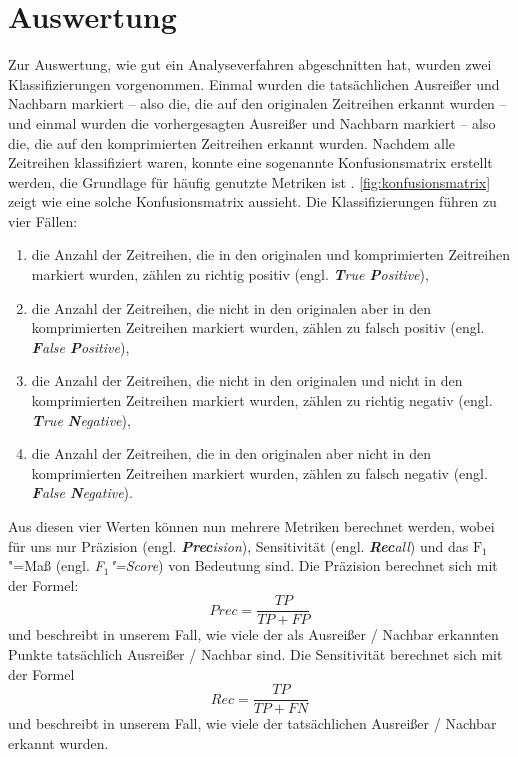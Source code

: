 \section{Auswertung}\label{sec:auswertung}
\newcommand{\tikztextc}[3]{\node at (#1, #2) {\vphantom{/}\smash{#3}};}
\newcommand{\tikztextupc}[3]{\node at (#1, #2) [rotate = 90] {\vphantom{/}\smash{#3}};}
Zur Auswertung, wie gut ein Analyseverfahren abgeschnitten hat, wurden zwei Klassifizierungen vorgenommen. Einmal wurden die tatsächlichen Ausreißer und Nachbarn markiert -- also die, die auf den originalen Zeitreihen erkannt wurden -- und einmal wurden die vorhergesagten Ausreißer und Nachbarn markiert -- also die, die auf den komprimierten Zeitreihen erkannt wurden. Nachdem alle Zeitreihen klassifiziert waren, konnte eine sogenannte Konfusionsmatrix erstellt werden, die Grundlage für häufig genutzte Metriken ist \cite{konfusionsmatrix}. \autoref{fig:konfusionsmatrix} zeigt wie eine solche Konfusionsmatrix aussieht. Die Klassifizierungen führen zu vier Fällen: \begin{enumerate}
    \item die Anzahl der Zeitreihen, die in den originalen und komprimierten Zeitreihen markiert wurden, zählen zu richtig positiv (engl. \textit{\textbf{T}rue \textbf{P}ositive}),
    \item die Anzahl der Zeitreihen, die nicht in den originalen aber in den komprimierten Zeitreihen markiert wurden, zählen zu falsch positiv (engl. \textit{\textbf{F}alse \textbf{P}ositive}),
    \item die Anzahl der Zeitreihen, die nicht in den originalen und nicht in den komprimierten Zeitreihen markiert wurden, zählen zu richtig negativ (engl. \textit{\textbf{T}rue \textbf{N}egative}),
    \item die Anzahl der Zeitreihen, die in den originalen aber nicht in den komprimierten Zeitreihen markiert wurden, zählen zu falsch negativ (engl. \textit{\textbf{F}alse \textbf{N}egative}).
\end{enumerate} 

Aus diesen vier Werten können nun mehrere Metriken berechnet werden, wobei für uns nur Präzision (engl. \textit{\textbf{Prec}ision}), Sensitivität (engl. \textit{\textbf{Rec}all}) und das $\text{F}_1$"=Maß (engl. \textit{F$_1$"=Score}) von Bedeutung sind. Die Präzision berechnet sich mit der Formel: \[Prec = \frac{TP}{TP + FP}\]
und beschreibt in unserem Fall, wie viele der als Ausreißer / Nachbar erkannten Punkte tatsächlich Ausreißer / Nachbar sind. Die Sensitivität berechnet sich mit der Formel \[Rec = \frac{TP}{TP + FN}\] und beschreibt in unserem Fall, wie viele der tatsächlichen Ausreißer / Nachbar erkannt wurden.

